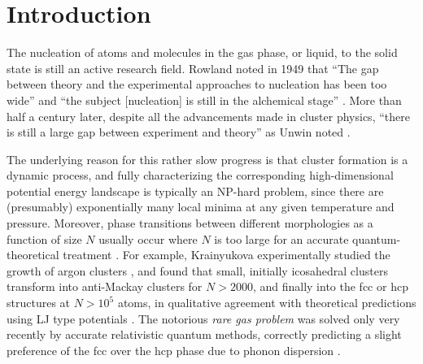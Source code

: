 \section{Introduction}


The nucleation of atoms and molecules in the gas phase, or liquid, to the solid
state is still an active research
field\autocite{Stillinger_Packingstructurestransitions_1984,
Martin-1996,Wales-1996, Vlieg_atomicscaleunderstandingcrystal_2007, Arkus-2010,
Woodley-2010, Karthika-2016, Holmes-Cerfon_StickySphereClusters_2017}.  Rowland
noted in 1949 that ``The gap between theory and the experimental approaches to
nucleation has been too wide'' and ``the subject [nucleation] is still in the
alchemical stage'' \autocite{Rowland-1949}. More than half a century later,
despite all the advancements made in cluster physics, ``there is still a large
gap between experiment and theory'' as Unwin noted \autocite{Unwin-2007}.

The underlying reason for this rather slow progress is that cluster formation
is a dynamic process, and fully characterizing the corresponding
high-dimensional potential energy landscape is typically an NP-hard problem,
since there are (presumably) exponentially many local minima at any given
temperature and pressure\autocite{Stillinger_Packingstructurestransitions_1984,
Oganov-2006, Massen_Powerlawdistributionsareas_2007, wales10, Oganov-2011,
calvo12, Wales-2015}.  Moreover, phase transitions between different
morphologies as a function of size $N$ usually occur where $N$ is too large for
an accurate quantum-theoretical treatment \autocite{Waal89,
Cleveland_energeticsstructurenickel_1991, vandewaal96a, Doye-1995,
vandeWaalTd00}.  For example, Krainyukova experimentally studied the growth of
argon clusters \autocite{Krainyukova-2012}, and found that small, initially
icosahedral clusters transform into anti-Mackay clusters for $N>2000$, and
finally into the \ac{fcc} or hcp structures at $N>10^5$ atoms, in
qualitative agreement with theoretical predictions using \ac{LJ} type
potentials \autocite{Martin-1996,
Schwerdtfeger_ExtensionLennardJonespotential_2006, Krainyukova-2007}.  The
notorious \textit{rare gas problem} was solved only very recently by accurate
relativistic quantum methods, correctly predicting a slight preference of the
\ac{fcc} over the hcp phase due to phonon dispersion \autocite{Schwerdtfeger-2016}.

